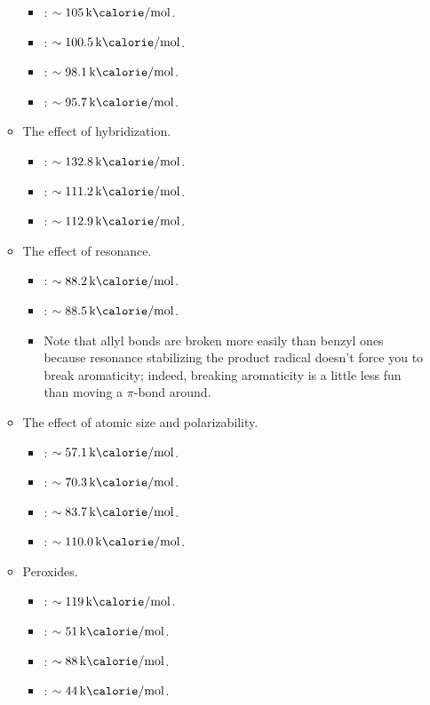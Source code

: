 \documentclass[../notes.tex]{subfiles}
\begin{document}
\begin{itemize}
\begin{itemize}
\begin{itemize}
            \item {}: $\sim\kcal{105}$.
            \item {}: $\sim\kcal{100.5}$.
            \item {}: $\sim\kcal{98.1}$.
            \item {}: $\sim\kcal{95.7}$.
        \end{itemize}
        \item The effect of hybridization.
        \begin{itemize}
            \item {}: $\sim\kcal{132.8}$.
            \item {}: $\sim\kcal{111.2}$.
            \item {}: $\sim\kcal{112.9}$.
        \end{itemize}
        \item The effect of resonance.
        \begin{itemize}
            \item {}: $\sim\kcal{88.2}$.
            \item {}: $\sim\kcal{88.5}$.
            \item Note that allyl bonds are broken more easily than benzyl ones because resonance stabilizing the product radical doesn't force you to break aromaticity; indeed, breaking aromaticity is a little less fun than moving a $\pi$-bond around.
        \end{itemize}
        \item The effect of atomic size and polarizability.
        \begin{itemize}
            \item {}: $\sim\kcal{57.1}$.
            \item {}: $\sim\kcal{70.3}$.
            \item {}: $\sim\kcal{83.7}$.
            \item {}: $\sim\kcal{110.0}$.
        \end{itemize}
        \item Peroxides.
        \begin{itemize}
            \item {}: $\sim\kcal{119}$.
            \item {}: $\sim\kcal{51}$.
            \item {}: $\sim\kcal{88}$.
            \item {}: $\sim\kcal{44}$.

\end{itemize}
\end{itemize}
\end{itemize}
\end{document}
